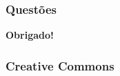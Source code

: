 \documentclass{beamer}
\begin{document}
\begin{frame}
  \frametitle{Questões}
  \begin{center}
   \large \textbf{Obrigado!}
  \end{center}

\end{frame}

\begin{frame}

  \frametitle{Creative Commons}
  \begin{center}
  \end{center}
\end{frame}
\end{document}
